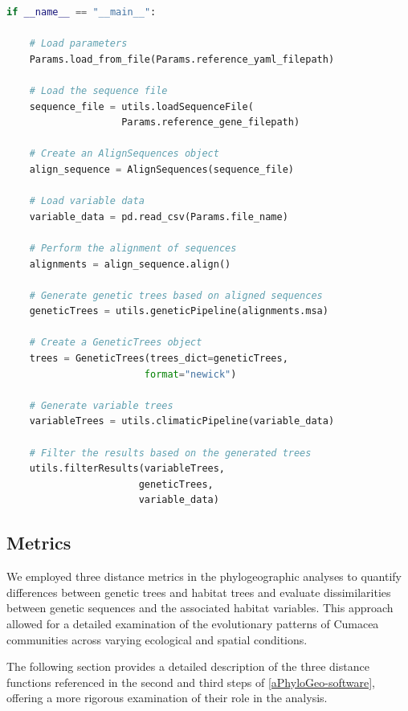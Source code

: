 \begin{lstlisting}[label=lst:main,language=Python,caption=Main script for tutorial using the aPhyloGeo package.]
if __name__ == "__main__":

    # Load parameters
    Params.load_from_file(Params.reference_yaml_filepath)

    # Load the sequence file
    sequence_file = utils.loadSequenceFile(
                    Params.reference_gene_filepath)

    # Create an AlignSequences object
    align_sequence = AlignSequences(sequence_file)

    # Load variable data
    variable_data = pd.read_csv(Params.file_name)

    # Perform the alignment of sequences
    alignments = align_sequence.align()

    # Generate genetic trees based on aligned sequences
    geneticTrees = utils.geneticPipeline(alignments.msa)

    # Create a GeneticTrees object
    trees = GeneticTrees(trees_dict=geneticTrees,
                        format="newick")

    # Generate variable trees
    variableTrees = utils.climaticPipeline(variable_data)

    # Filter the results based on the generated trees
    utils.filterResults(variableTrees,
                       geneticTrees,
                       variable_data)
\end{lstlisting}

\subsection{Metrics}\label{metrics}
We employed three distance metrics in the phylogeographic analyses to quantify differences between genetic trees and habitat trees and evaluate dissimilarities between genetic sequences and the associated habitat variables. This approach allowed for a detailed examination of the evolutionary patterns of Cumacea communities across varying ecological and spatial conditions.

The following section provides a detailed description of the three distance functions referenced in the second and third steps of \autoref{aPhyloGeo-software}, offering a more rigorous examination of their role in the analysis.

